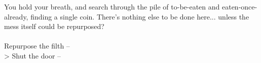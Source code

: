 You hold your breath, and search through the pile of to-be-eaten and eaten-once-already, finding a single coin. There’s nothing else to be done here... unless the mess itself could be repurposed?\\
\\

 Repurpose the filth -- \\
> Shut the door -- 